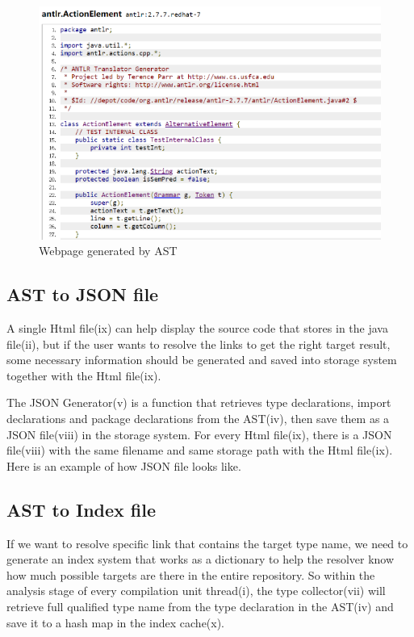 \documentclass[runningheads]{llncs}
\begin{document}
\begin{figure}[H]
	\centering
	\includegraphics[width=12cm]{pic/webpage-sample.png}
	\caption{Webpage generated by AST}
	\label{Webpage generated by AST}
\end{figure}

\subsection{AST to JSON file}

A single Html file(ix) can help display the source code that stores in the java file(ii), but if the user wants to resolve the links to get the right target result, some necessary information should be generated and saved into storage system together with the Html file(ix). 

The JSON Generator(v) is a function that retrieves type declarations, import declarations and package declarations from the AST(iv), then save them as a JSON file(viii) in the storage system. For every Html file(ix), there is a JSON file(viii) with the same filename and same storage path with the Html file(ix). Here is an example of how JSON file looks like.

\subsection{AST to Index file}
If we want to resolve specific link that contains the target type name, we need to generate an index system that works as a dictionary to help the resolver know how much possible targets are there in the entire repository. So within the analysis stage of every compilation unit thread(i), the type collector(vii) will retrieve full qualified type name from the type declaration in the AST(iv) and save it to a hash map in the index cache(x).
\end{document}
